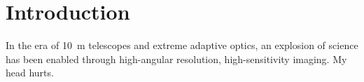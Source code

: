 \section{Introduction}
\label{sec:intro}

In the era of \SI{10}{\meter} telescopes and extreme adaptive optics, an explosion of science has been enabled through high-angular resolution, high-sensitivity imaging. My head hurts.